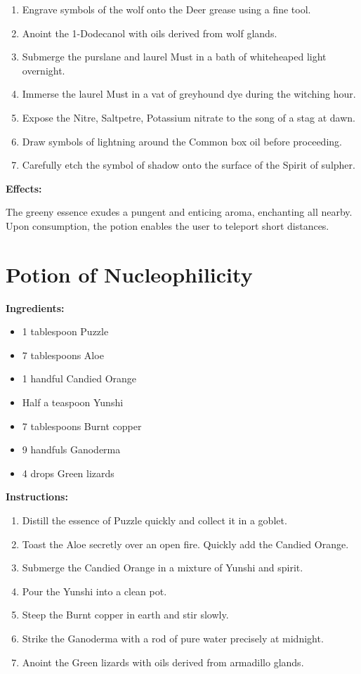 \documentclass{article}
\begin{document}
\begin{enumerate}
  \item Engrave symbols of the wolf onto the Deer grease using a fine tool.
  \item Anoint the 1-Dodecanol with oils derived from wolf glands.
  \item Submerge the purslane and laurel Must in a bath of whiteheaped light overnight.
  \item Immerse the laurel Must in a vat of greyhound dye during the witching hour.
  \item Expose the Nitre, Saltpetre, Potassium nitrate to the song of a stag at dawn.
  \item Draw symbols of lightning around the Common box oil before proceeding.
  \item Carefully etch the symbol of shadow onto the surface of the Spirit of sulpher.
\end{enumerate}

\textbf{Effects:}

The greeny essence exudes a pungent and enticing aroma, enchanting all nearby. Upon consumption, the potion enables the user to teleport short distances.

\newpage
\section*{Potion of Nucleophilicity}

\textbf{Ingredients:}

\begin{itemize}
  \item 1 tablespoon Puzzle
  \item 7 tablespoons Aloe
  \item 1 handful Candied Orange
  \item Half a teaspoon Yunshi
  \item 7 tablespoons Burnt copper
  \item 9 handfuls Ganoderma
  \item 4 drops Green lizards
\end{itemize}

\textbf{Instructions:}

\begin{enumerate}
  \item Distill the essence of Puzzle quickly and collect it in a goblet.
  \item Toast the Aloe secretly over an open fire. Quickly add the Candied Orange.
  \item Submerge the Candied Orange in a mixture of Yunshi and spirit.
  \item Pour the Yunshi into a clean pot.
  \item Steep the Burnt copper in earth and stir slowly.
  \item Strike the Ganoderma with a rod of pure water precisely at midnight.
  \item Anoint the Green lizards with oils derived from armadillo glands.
\end{enumerate}
\end{document}
